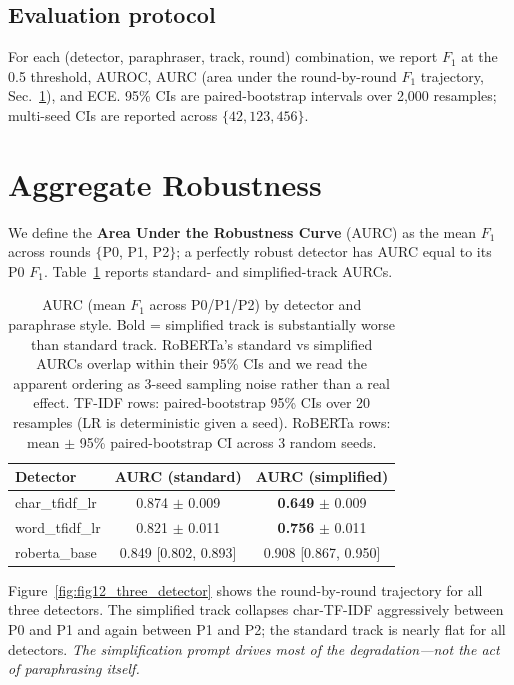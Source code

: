\documentclass[11pt,a4paper]{article}
\begin{document}
\subsection{Evaluation protocol}
For each (detector, paraphraser, track, round) combination, we report
$F_1$ at the 0.5 threshold, AUROC, AURC (area under the round-by-round
$F_1$ trajectory, Sec.~\ref{sec:robustness}), and ECE.
95\% CIs are paired-bootstrap intervals over 2{,}000 resamples;
multi-seed CIs are reported across $\{42, 123, 456\}$.

\section{Aggregate Robustness}
\label{sec:robustness}

We define the \textbf{Area Under the Robustness Curve} (AURC)
\citep[adapted from][]{taori2020measuring} as the mean $F_1$ across rounds
$\{$P0, P1, P2$\}$; a perfectly robust detector has AURC equal to its P0
$F_1$. Table~\ref{tab:aurc} reports standard- and simplified-track AURCs.

\begin{table}[htbp]
\centering
\small
\begin{tabular}{lcc}
\toprule
\textbf{Detector} & \textbf{AURC (standard)} & \textbf{AURC (simplified)} \\
\midrule
char\_tfidf\_lr & 0.874 $\pm$ 0.009 & \textbf{0.649} $\pm$ 0.009 \\
word\_tfidf\_lr & 0.821 $\pm$ 0.011 & \textbf{0.756} $\pm$ 0.011 \\
roberta\_base & 0.849 [0.802, 0.893] & 0.908 [0.867, 0.950] \\
\bottomrule
\end{tabular}
\caption{AURC (mean $F_1$ across P0/P1/P2) by detector and paraphrase style.
Bold = simplified track is substantially worse than standard track.
RoBERTa's standard vs simplified AURCs overlap within their 95\% CIs and we
read the apparent ordering as 3-seed sampling noise rather than a real
effect.
TF-IDF rows: paired-bootstrap 95\% CIs over 20 resamples (LR is deterministic
given a seed). RoBERTa rows: mean $\pm$ 95\% paired-bootstrap CI across 3
random seeds.}
\label{tab:aurc}
\end{table}

Figure~\ref{fig:fig12_three_detector} shows the round-by-round trajectory for
all three detectors. The simplified track collapses char-TF-IDF aggressively
between P0 and P1 and again between P1 and P2; the standard track is nearly
flat for all detectors. \emph{The simplification prompt drives most of the
degradation—not the act of paraphrasing itself.}
\end{document}
